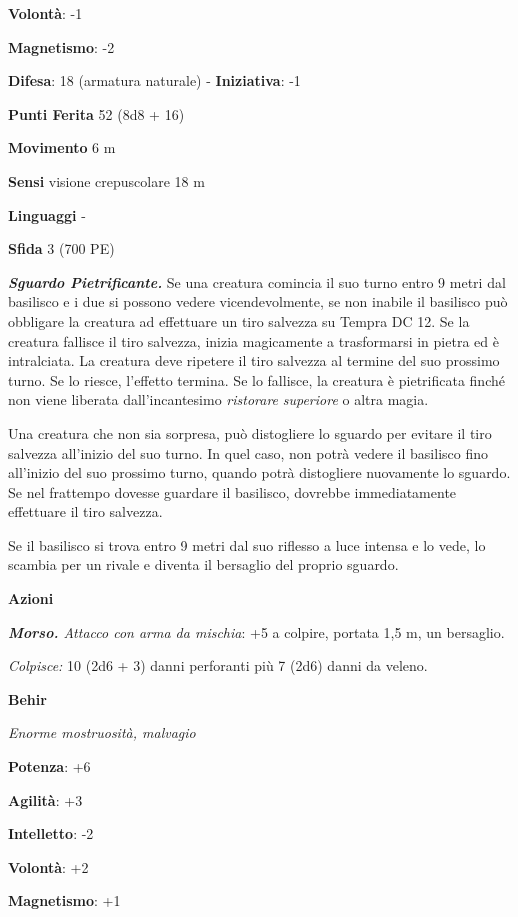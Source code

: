 \begin{multicols}{2}
\textbf{Volontà}: -1

\textbf{Magnetismo}: -2

\textbf{Difesa}: 18 (armatura naturale) - \textbf{Iniziativa}: -1

\textbf{Punti Ferita} 52 (8d8 + 16)

\textbf{Movimento} 6 m

\textbf{Sensi} visione crepuscolare 18 m

\textbf{Linguaggi} -

\textbf{Sfida} 3 (700 PE)

\emph{\textbf{Sguardo Pietrificante.}} Se una creatura comincia il suo
turno entro 9 metri dal basilisco e i due si possono vedere
vicendevolmente, se non inabile il basilisco può obbligare la creatura ad effettuare un tiro salvezza su Tempra DC 12. Se la creatura fallisce il tiro  salvezza, inizia magicamente a trasformarsi in pietra ed è   intralciata. La creatura deve ripetere il tiro salvezza al termine del   suo prossimo turno. Se lo riesce, l'effetto termina. Se lo fallisce,   la creatura è pietrificata finché non viene liberata dall'incantesimo  \emph{ristorare} \emph{superiore} o altra magia.


Una creatura che non sia sorpresa, può distogliere lo sguardo per
evitare il tiro salvezza all'inizio del suo turno. In quel caso, non
potrà vedere il basilisco fino all'inizio del suo prossimo turno, quando
potrà distogliere nuovamente lo sguardo. Se nel frattempo dovesse
guardare il basilisco, dovrebbe immediatamente effettuare il tiro
salvezza.

Se il basilisco si trova entro 9 metri dal suo riflesso a luce intensa e
lo vede, lo scambia per un rivale e diventa il bersaglio del proprio
sguardo.

\textbf{Azioni}

\emph{\textbf{Morso.} Attacco con arma da mischia}: +5 a colpire,
portata 1,5 m, un bersaglio.

\emph{Colpisce:} 10 (2d6 + 3) danni perforanti più 7 (2d6) danni da
veleno.




\textbf{Behir}

\emph{Enorme mostruosità, malvagio}

\textbf{Potenza}: +6

\textbf{Agilità}: +3

\textbf{Intelletto}: -2

\textbf{Volontà}: +2

\textbf{Magnetismo}: +1


\end{multicols}
